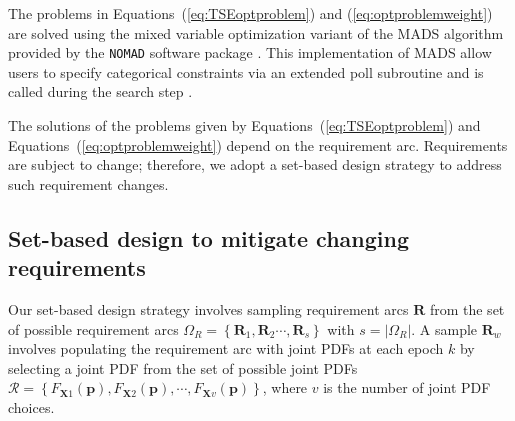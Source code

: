 The problems in Equations~(\ref{eq:TSEoptproblem}) and (\ref{eq:optproblemweight}) are solved using the mixed variable optimization variant of the \ac{MADS} algorithm provided by the \texttt{NOMAD} software package \cite{Abramson2009}. This implementation of \ac{MADS} allow users to specify categorical constraints via an extended poll subroutine and is called during the search step \cite{Abramson2004,Abramson2008}.

The solutions of the problems given by Equations~(\ref{eq:TSEoptproblem}) and Equations~(\ref{eq:optproblemweight}) depend on the requirement arc. Requirements are subject to change; therefore, we adopt a set-based design strategy to address such requirement changes.

\subsection{Set-based design to mitigate changing requirements} \label{subsec:SBDproblem}


Our set-based design strategy involves sampling requirement arcs $\mathbf{R}$ from the set of possible requirement arcs $\Omega_R = \left\{\mathbf{R}_1,\mathbf{R}_2\cdots,\mathbf{R}_s\right\}$ with $s = |\Omega_R|$. A sample $\mathbf{R}_w$ involves populating the requirement arc with joint \acp{PDF} at each epoch $k$ by selecting a joint \ac{PDF} from the set of possible joint \acp{PDF} $\mathcal{R} = \left\{F_{\mathbf{X}1}(\mathbf{p}),F_{\mathbf{X}2}(\mathbf{p}),\cdots,F_{\mathbf{X}v}(\mathbf{p})\right\}$, where $v$ is the number of joint \ac{PDF} choices. 

